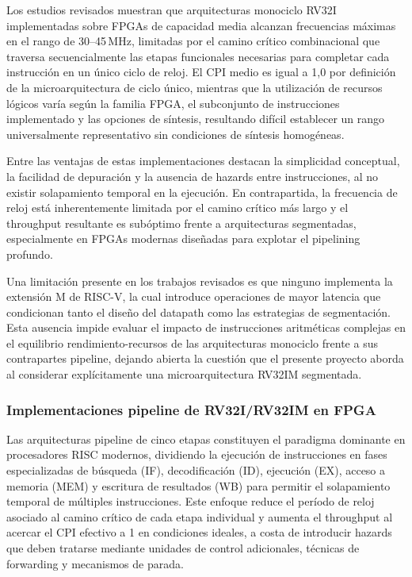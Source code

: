Los estudios revisados muestran que arquitecturas monociclo RV32I
implementadas sobre FPGAs de capacidad media alcanzan frecuencias máximas
en el rango de 30--45\,MHz, limitadas por el camino crítico combinacional
que traversa secuencialmente las etapas funcionales necesarias para completar
cada instrucción en un único ciclo de reloj.
\parencite{Anjana2025Implementation}
El CPI medio es igual a 1{,}0 por definición de la microarquitectura de
ciclo único, mientras que la utilización de recursos lógicos varía según la
familia FPGA, el subconjunto de instrucciones implementado y las opciones
de síntesis, resultando difícil establecer un rango universalmente
representativo sin condiciones de síntesis homogéneas.

Entre las ventajas de estas implementaciones destacan la simplicidad
conceptual, la facilidad de depuración y la ausencia de hazards entre
instrucciones, al no existir solapamiento temporal en la
ejecución.\parencite{Harris2021Digital}
En contrapartida, la frecuencia de reloj está inherentemente limitada por
el camino crítico más largo y el throughput resultante es subóptimo frente
a arquitecturas segmentadas, especialmente en FPGAs modernas diseñadas para
explotar el pipelining profundo.\parencite{Patterson2017Computer}

Una limitación presente en los trabajos revisados es que ninguno implementa
la extensión M de RISC-V, la cual introduce operaciones de mayor latencia
que condicionan tanto el diseño del datapath como las estrategias de
segmentación.\parencite{RISCV2019Manual}
Esta ausencia impide evaluar el impacto de instrucciones aritméticas
complejas en el equilibrio rendimiento-recursos de las arquitecturas
monociclo frente a sus contrapartes pipeline, dejando abierta la cuestión
que el presente proyecto aborda al considerar explícitamente una
microarquitectura RV32IM segmentada.


\subsubsection{Implementaciones pipeline de RV32I/RV32IM en FPGA}

Las arquitecturas pipeline de cinco etapas constituyen el paradigma dominante
en procesadores RISC modernos, dividiendo la ejecución de instrucciones en
fases especializadas de búsqueda (IF), decodificación (ID), ejecución (EX),
acceso a memoria (MEM) y escritura de resultados (WB) para permitir el
solapamiento temporal de múltiples instrucciones.\parencite{Patterson2017Computer,Harris2021Digital}
Este enfoque reduce el período de reloj asociado al camino crítico de cada
etapa individual y aumenta el throughput al acercar el CPI efectivo a 1 en
condiciones ideales, a costa de introducir hazards que deben tratarse mediante
unidades de control adicionales, técnicas de forwarding y mecanismos de parada.

